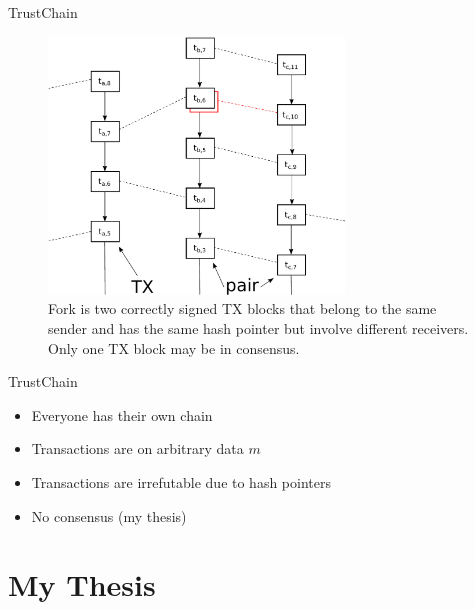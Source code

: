 \documentclass{beamer}
\begin{document}
\begin{frame}{TrustChain}{}

  \begin{figure}[h]
  \includegraphics[width=0.7\textwidth]{figures/trustchain-bad}
  \centering
  \caption{Fork is two correctly signed TX blocks that belong to the same sender
    and has the same hash pointer but involve different receivers. Only one TX
    block may be in consensus.}
  \end{figure}

\end{frame}

\begin{frame}{TrustChain}
  \begin{itemize}
    \item Everyone has their own chain
    \item Transactions are on arbitrary data $m$
    \item Transactions are irrefutable due to hash pointers
    \item No consensus (my thesis)
  \end{itemize}
\end{frame}

\section{My Thesis}
\end{document}
